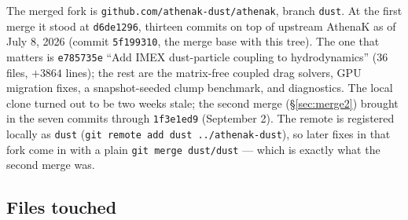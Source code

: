 \documentclass[11pt]{article}
\newcommand{\code}[1]{\texttt{#1}}
\begin{document}
The merged fork is \code{github.com/athenak-dust/athenak}, branch \code{dust}. At
the first merge it stood at \code{d6de1296}, thirteen commits on top of upstream
AthenaK as of July 8, 2026 (commit \code{5f199310}, the merge base with this tree).
The one that matters is \code{e785735e} ``Add IMEX dust-particle coupling to
hydrodynamics'' (36 files, $+3864$ lines); the rest are the matrix-free coupled drag
solvers, GPU migration fixes, a snapshot-seeded clump benchmark, and diagnostics.
The local clone turned out to be two weeks stale; the second merge (\S\ref{sec:merge2})
brought in the seven commits through \code{1f3e1ed9} (September 2). The remote is
registered locally as \code{dust} (\code{git remote add dust ../athenak-dust}), so
later fixes in that fork come in with a plain \code{git merge dust/dust} --- which is
exactly what the second merge was.

\subsection{Files touched}
\end{document}
